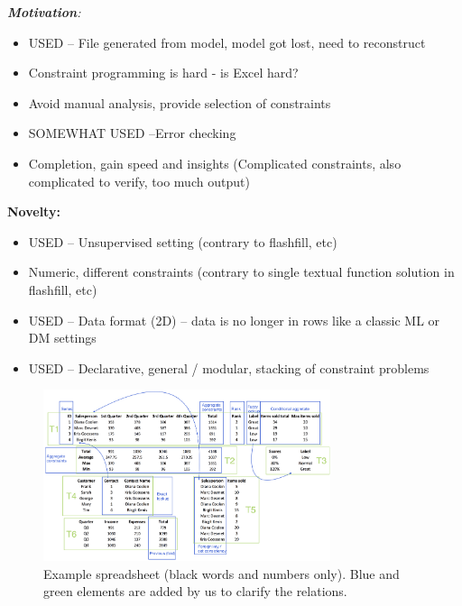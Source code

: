 \documentclass{ecai}
\begin{document}

{\it
\textbf{Motivation}:
\begin{itemize}
  \item USED -- File generated from model, model got lost, need to reconstruct
  \item Constraint programming is hard - is Excel hard?
  \item Avoid manual analysis, provide selection of constraints
  \item SOMEWHAT USED --Error checking
  \item Completion, gain speed and insights (Complicated constraints, also complicated to verify, too much output)
\end{itemize}

\textbf{Novelty:}
\begin{itemize}
  \item USED -- Unsupervised setting (contrary to flashfill, etc)
  \item Numeric, different constraints (contrary to single textual function solution in flashfill, etc)
  \item USED -- Data format (2D) -- data is no longer in rows like a classic ML or DM settings
  \item USED -- Declarative, general / modular, stacking of constraint problems
\end{itemize}

\begin{figure}[tbh]
  \begin{center}
    \includegraphics[width=0.75\textwidth]{figures/Demo.png}
  \end{center}
  \vspace{-10pt}
  \caption{Example spreadsheet (black words and numbers only). Blue and green elements are added by us to clarify the relations.}
  \label{fig:main_example}
\end{figure}
}
\end{document}
